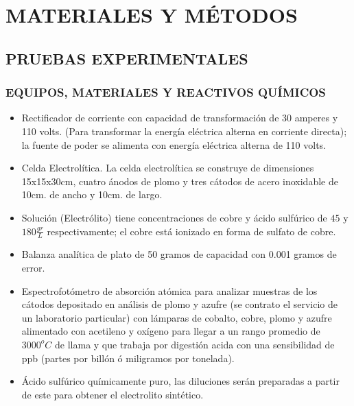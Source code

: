 \chapter{MATERIALES Y M\'ETODOS}

\section{PRUEBAS EXPERIMENTALES}
\subsection{EQUIPOS, MATERIALES Y REACTIVOS QU\'IMICOS}
\begin{itemize}
 \item Rectificador de corriente con capacidad de transformaci\'on de 30 amperes y 110 volts. (Para transformar la energ\'ia el\'ectrica alterna en corriente directa); la fuente de poder se alimenta con energ\'ia el\'ectrica alterna de 110 volts.

 \item Celda Electrolítica. La celda electrol\'itica se construye de dimensiones 15x15x30cm, cuatro \'anodos de plomo y tres c\'atodos de acero inoxidable de 10cm. de ancho y 10cm. de largo.

 \item Soluci\'on (Electr\'olito) tiene concentraciones de cobre y \'acido sulf\'urico de $45$ y $180 \frac{gr}{L}$ respectivamente; el cobre est\'a ionizado en forma de sulfato de cobre. 

 \item Balanza anal\'itica de plato de 50 gramos de capacidad con 0.001 gramos de error.

 \item Espectrofot\'ometro de absorci\'on at\'omica para analizar muestras de los c\'atodos depositado en an\'alisis de plomo y azufre (se contrato el servicio de un laboratorio particular) con l\'amparas de cobalto, cobre, plomo y azufre alimentado con acetileno y ox\'igeno para llegar a un rango promedio de $3000^oC$ de llama y que trabaja por digesti\'on acida con una sensibilidad de ppb (partes por bill\'on \'o miligramos por tonelada).

 \item \'Acido sulf\'urico qu\'imicamente puro, las diluciones ser\'an preparadas a partir de este para obtener el electrolito sint\'etico.


\end{itemize}
